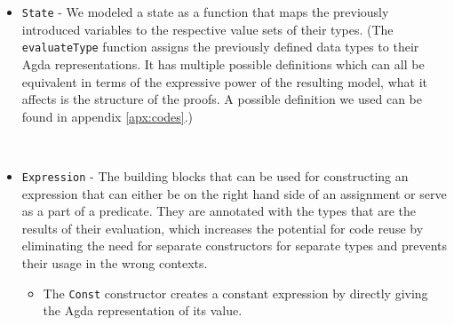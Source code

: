 \begin{itemize}
    \item \verb|State| - We modeled a state as a function that maps the previously introduced variables to the respective value sets of their types. (The \verb|evaluateType| function assigns the previously defined data types to their Agda representations. It has multiple possible definitions which can all be equivalent in terms of the expressive power of the resulting model, what it affects is the structure of the proofs. A possible definition we used can be found in appendix \ref{apx:codes}.)
    \begin{code}
        \>[2]\AgdaSpace{}%
        \AgdaSymbol{:}\AgdaSpace{}%
        \<%
        \\
        \>[2]\AgdaSpace{}%
        \AgdaSymbol{=}\AgdaSpace{}%
        \AgdaSymbol{(}\AgdaSpace{}%
        \AgdaSymbol{:}\AgdaSpace{}%
        \AgdaSymbol{)}\AgdaSpace{}%
        \AgdaSpace{}%
        \AgdaSpace{}%
        \AgdaSymbol{(}\AgdaSpace{}%
        \AgdaSymbol{)}\<%
    \end{code}
    
    \item \verb|Expression| - The building blocks that can be used for constructing an expression that can either be on the right hand side of an assignment or serve as a part of a predicate. They are annotated with the types that are the results of their evaluation, which increases the potential for code reuse by eliminating the need for separate constructors for separate types and prevents their usage in the wrong contexts.
    \begin{code}
        \>[2]\AgdaSpace{}%
        \AgdaSpace{}%
        \AgdaSymbol{:}\AgdaSpace{}%
        \AgdaSpace{}%
        \AgdaSpace{}%
        \AgdaSpace{}%
        \<%
    \end{code}
    \begin{itemize}
        \item The \verb|Const| constructor creates a constant expression by directly giving the Agda representation of its value.
        \begin{code}
            \>[4]\AgdaSpace{}%
            \AgdaSymbol{:}\AgdaSpace{}%
            \AgdaSymbol{\{}\AgdaSpace{}%
            \AgdaSymbol{:}\AgdaSpace{}%
            \AgdaSymbol{\}}\AgdaSpace{}%
            \AgdaSpace{}%
            \AgdaSpace{}%
            \AgdaSpace{}%
            \AgdaSpace{}%
            \AgdaSpace{}%
            \<%
        \end{code}
        

\end{itemize}
\end{itemize}
